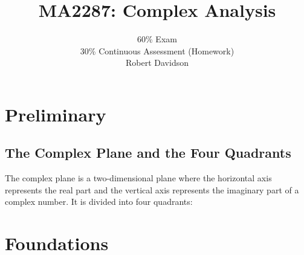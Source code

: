 \documentclass[a4paper, 10pt]{article}
\title{
\textbf{MA2287: Complex Analysis} \\ 
}
\author{
  60\% Exam\\
  30\% Continuous Assessment (Homework) \\
  Robert Davidson
}
\date{} %
\begin{document}
\maketitle
\pagebreak
\tableofcontents
\pagebreak


\section{Preliminary}
\subsection{The Complex Plane and the Four Quadrants}

\begin{minipage}{0.5\textwidth}
  The complex plane is a two-dimensional plane where the horizontal axis represents the real part and the vertical axis represents the imaginary part of a complex number. It is divided into four quadrants:
\end{minipage}
\begin{minipage}{0.5\textwidth}
  \begin{center}
  \end{center}
\end{minipage}




\section{Foundations}
\end{document}
